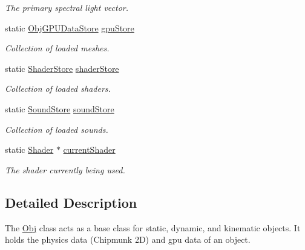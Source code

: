 \begin{DoxyCompactItemize}
\begin{DoxyCompactList}\small\item\em The primary spectral light vector. \end{DoxyCompactList}\item 
static \hyperlink{class_obj_g_p_u_data_store}{Obj\+G\+P\+U\+Data\+Store} \hyperlink{class_obj_a4e15bc90d96cfa160419902cfb472b5d}{gpu\+Store}\hypertarget{class_obj_a4e15bc90d96cfa160419902cfb472b5d}{}\label{class_obj_a4e15bc90d96cfa160419902cfb472b5d}

\begin{DoxyCompactList}\small\item\em Collection of loaded meshes. \end{DoxyCompactList}\item 
static \hyperlink{class_shader_store}{Shader\+Store} \hyperlink{class_obj_a9669a57ca6d316e1dd80c9315034c762}{shader\+Store}\hypertarget{class_obj_a9669a57ca6d316e1dd80c9315034c762}{}\label{class_obj_a9669a57ca6d316e1dd80c9315034c762}

\begin{DoxyCompactList}\small\item\em Collection of loaded shaders. \end{DoxyCompactList}\item 
static \hyperlink{class_sound_store}{Sound\+Store} \hyperlink{class_obj_a5aae696952a7ebd5a74480b000fb30e7}{sound\+Store}\hypertarget{class_obj_a5aae696952a7ebd5a74480b000fb30e7}{}\label{class_obj_a5aae696952a7ebd5a74480b000fb30e7}

\begin{DoxyCompactList}\small\item\em Collection of loaded sounds. \end{DoxyCompactList}\item 
static \hyperlink{class_shader}{Shader} $\ast$ \hyperlink{class_obj_a5c4454f79f8a8ba8fb13b9f830be3505}{current\+Shader}\hypertarget{class_obj_a5c4454f79f8a8ba8fb13b9f830be3505}{}\label{class_obj_a5c4454f79f8a8ba8fb13b9f830be3505}

\begin{DoxyCompactList}\small\item\em The shader currently being used. \end{DoxyCompactList}\end{DoxyCompactItemize}


\subsection{Detailed Description}
The \hyperlink{class_obj}{Obj} class acts as a base class for static, dynamic, and kinematic objects. It holds the physics data (Chipmunk 2D) and gpu data of an object. 

